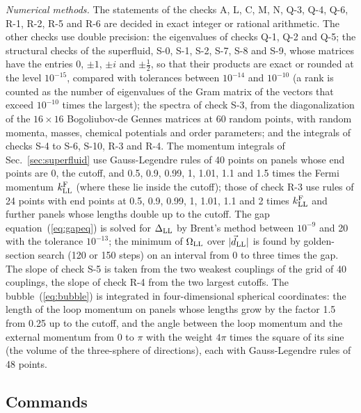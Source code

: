 \emph{Numerical methods.} The statements of the checks A, L, C, M, N, Q-3, Q-4, Q-6, R-1, R-2, R-5
and R-6 are decided in exact integer or rational arithmetic. The other checks use double precision:
the eigenvalues of checks Q-1, Q-2 and Q-5; the structural checks of the superfluid, S-0, S-1, S-2,
S-7, S-8 and S-9, whose matrices have the entries 0, $\pm1$, $\pm i$ and $\pm\tfrac12$, so that their
products are exact or rounded at the level $10^{-15}$, compared with tolerances between $10^{-14}$ and
$10^{-10}$ (a rank is counted as the number of eigenvalues of the Gram matrix of the vectors that exceed
$10^{-10}$ times the largest); the spectra of check S-3, from the diagonalization of the $16\times16$
Bogoliubov-de Gennes matrices at 60 random points, with random momenta, masses, chemical potentials and
order parameters; and the integrals of checks S-4 to S-6, S-10, R-3 and R-4. The momentum integrals of Sec.~\ref{sec:superfluid} use Gauss-Legendre rules of 40 points on panels whose
end points are 0, the cutoff, and 0.5, 0.9, 0.99, 1, 1.01, 1.1 and 1.5 times the Fermi momentum $k^{\rm
F}_{\rm LL}$ (where these lie inside the cutoff); those of check R-3 use rules of 24 points with end points
at 0.5, 0.9, 0.99, 1, 1.01, 1.1 and 2 times $k^{\rm F}_{\rm LL}$ and further panels whose lengths double
up to the cutoff. The gap equation~(\ref{eq:gapeq}) is solved for $\Delta_{\rm LL}$ by Brent's method
between $10^{-9}$ and 20 with the tolerance $10^{-13}$; the minimum of $\Omega_{\rm LL}$ over
$\lvert\vec d_{\rm LL}\rvert$ is found by golden-section search (120 or 150 steps) on an interval from 0 to
three times the gap. The slope of check S-5 is taken from the two weakest couplings of the grid of 40
couplings, the slope of check R-4 from the two largest cutoffs. The bubble~(\ref{eq:bubble}) is
integrated in four-dimensional spherical coordinates: the length of the loop momentum on panels whose
lengths grow by the factor 1.5 from 0.25 up to the cutoff, and the angle between the loop momentum and
the external momentum from 0 to $\pi$ with the weight $4\pi$ times the square of its sine (the volume of
the three-sphere of directions), each with Gauss-Legendre rules of 48 points.

\subsection{Commands}

